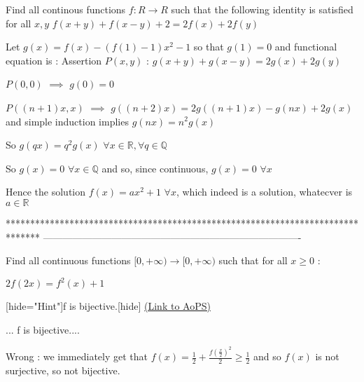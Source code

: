 \begin{solution}
	\begin{tcolorbox}Find all continous functions $f: R \to R$ such that the following identity is satisfied for all $x,y$ 
   $f(x+y)+f(x-y)+2=2f(x)+2f(y)$\end{tcolorbox}
Let $g(x)=f(x)-(f(1)-1)x^2-1$ so that $g(1)=0$ and functional equation is :
Assertion $P(x,y)$ : $g(x+y)+g(x-y)=2g(x)+2g(y)$

$P(0,0)$ $\implies$ $g(0)=0$

$P((n+1)x,x)$ $\implies$  $g((n+2)x)=2g((n+1)x)-g(nx)+2g(x)$ and simple induction implies $g(nx)=n^2g(x)$

So $g(qx)=q^2g(x)$ $\forall x\in\mathbb R,\forall q\in\mathbb Q$

So $g(x)=0$ $\forall x\in\mathbb Q$ and so, since continuous, $g(x)=0$ $\forall x$

Hence the solution $\boxed{f(x)=ax^2+1}$ $\forall x$, which indeed is a solution, whatecver is $a\in\mathbb R$
\end{solution}
*******************************************************************************
-------------------------------------------------------------------------------

\begin{problem}
	Find all continuous functions $ [ 0, +\infty ) \to [ 0, +\infty ) $ such that for all $x\ge 0$ :

$2f(2x)= f^2(x)+1$

[hide="Hint"]f is bijective.[\/hide]
	\flushright \href{https://artofproblemsolving.com/community/c6h570767}{(Link to AoPS)}
\end{problem}



\begin{solution}
	\begin{tcolorbox}... f is bijective....\end{tcolorbox}
Wrong : we immediately get that $f(x)=\frac 12+\frac{f(\frac x2)^2}2\ge \frac 12$ and so $f(x)$ is not surjective, so not bijective.
\end{solution}




